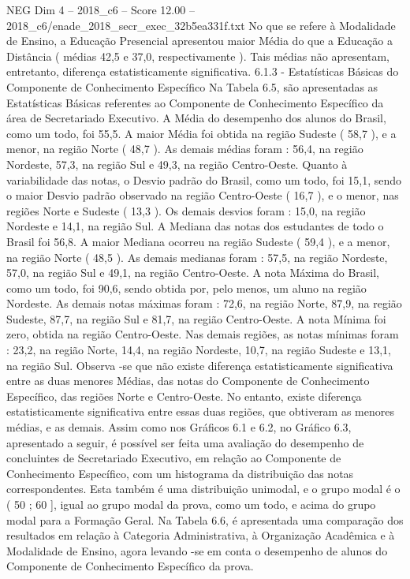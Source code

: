 \begin{textsample}{NEG Dim 4 – 2018\_c6 – Score 12.00 – 2018\_c6/enade\_2018\_secr\_exec\_32b5ea331f.txt}
No que se refere à Modalidade de Ensino, a Educação Presencial apresentou maior Média do que a Educação a Distância ( médias 42,5 e 37,0, respectivamente ).
Tais médias não apresentam, entretanto, diferença estatisticamente significativa. 6.1.3 - Estatísticas Básicas do Componente de Conhecimento Específico Na Tabela 6.5, são apresentadas as Estatísticas Básicas referentes ao Componente de Conhecimento Específico da área de Secretariado Executivo.
A Média do desempenho dos alunos do Brasil, como um todo, foi 55,5.
A maior Média foi obtida na região Sudeste ( 58,7 ), e a menor, na região Norte ( 48,7 ).
As demais médias foram : 56,4, na região Nordeste, 57,3, na região Sul e 49,3, na região Centro-Oeste.
Quanto à variabilidade das notas, o Desvio padrão do Brasil, como um todo, foi 15,1, sendo o maior Desvio padrão observado na região Centro-Oeste ( 16,7 ), e o menor, nas regiões Norte e Sudeste ( 13,3 ).
Os demais desvios foram : 15,0, na região Nordeste e 14,1, na região Sul.
A Mediana das notas dos estudantes de todo o Brasil foi 56,8.
A maior Mediana ocorreu na região Sudeste ( 59,4 ), e a menor, na região Norte ( 48,5 ).
As demais medianas foram : 57,5, na região Nordeste, 57,0, na região Sul e 49,1, na região Centro-Oeste.
A nota Máxima do Brasil, como um todo, foi 90,6, sendo obtida por, pelo menos, um aluno na região Nordeste.
As demais notas máximas foram : 72,6, na região Norte, 87,9, na região Sudeste, 87,7, na região Sul e 81,7, na região Centro-Oeste.
A nota Mínima foi zero, obtida na região Centro-Oeste.
Nas demais regiões, as notas mínimas foram : 23,2, na região Norte, 14,4, na região Nordeste, 10,7, na região Sudeste e 13,1, na região Sul.
Observa -se que não existe diferença estatisticamente significativa entre as duas menores Médias, das notas do Componente de Conhecimento Específico, das regiões Norte e Centro-Oeste.
No entanto, existe diferença estatisticamente significativa entre essas duas regiões, que obtiveram as menores médias, e as demais.
Assim como nos Gráficos 6.1 e 6.2, no Gráfico 6.3, apresentado a seguir, é possível ser feita uma avaliação do desempenho de concluintes de Secretariado Executivo, em relação ao Componente de Conhecimento Específico, com um histograma da distribuição das notas correspondentes.
Esta também é uma distribuição unimodal, e o grupo modal é o ( 50 ; 60 ], igual ao grupo modal da prova, como um todo, e acima do grupo modal para a Formação Geral.
Na Tabela 6.6, é apresentada uma comparação dos resultados em relação à Categoria Administrativa, à Organização Acadêmica e à Modalidade de Ensino, agora levando -se em conta o desempenho de alunos do Componente de Conhecimento Específico da prova.

\end{textsample}
